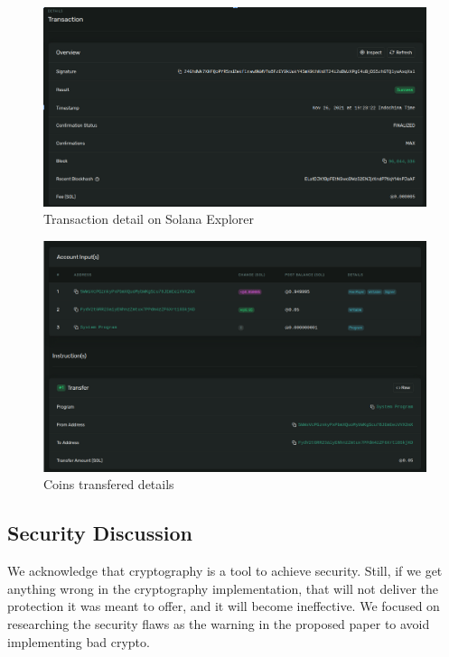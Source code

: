 \begin{itemize}
    \begin{figure}[ht!]
        \centering
        \includegraphics[width=1\textwidth]{images/testexplore1.png}
        \caption[Transaction detail on Solana Explorer]{Transaction detail on Solana Explorer}
        \label{fig:testexpl1}
    \end{figure}

    \begin{figure}[ht!]
        \centering
        \includegraphics[width=1\textwidth]{images/testexplorer2.png}
        \caption[Coins transfered details]{Coins transfered details}
        \label{fig:testexpl2}
    \end{figure}

\end{itemize}

\subsection{Security Discussion}

We acknowledge that cryptography is a tool to achieve security. Still, if we get anything wrong in the cryptography implementation, that will not deliver the protection it was meant to offer, and it will become ineffective. We focused on researching the security flaws as the warning in the proposed paper to avoid implementing bad crypto.

